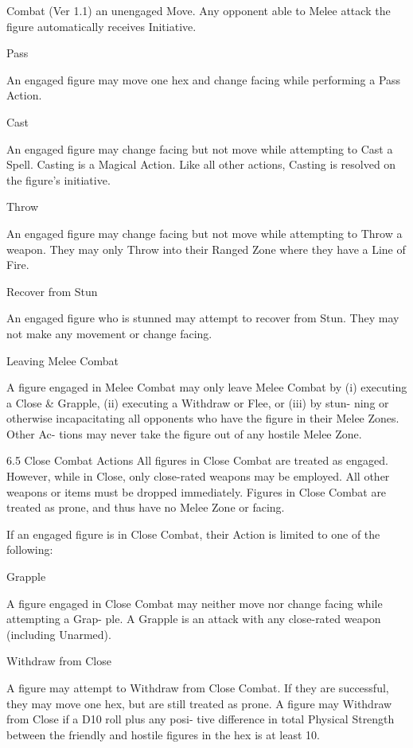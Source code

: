 \begin{Chapter}{Combat (Ver 1.1)}
an unengaged Move.  Any  opponent able  to  Melee 
attack the figure automatically receives Initiative. 

Pass 

An engaged figure may move one hex and change 
facing while performing a Pass Action. 

Cast 

An  engaged  figure  may  change  facing  but  not 
move while attempting to Cast a Spell. Casting is a 
Magical  Action.  Like  all  other  actions,  Casting  is 
resolved on the figure’s initiative. 

Throw 

An  engaged  figure  may  change  facing  but  not 
move  while  attempting  to  Throw  a  weapon.  They 
may  only  Throw  into  their  Ranged  Zone  where 
they have a Line of Fire. 

Recover from Stun 

An  engaged  figure  who  is  stunned  may  attempt  to 
recover  from  Stun.  They  may  not  make  any 
movement or change facing. 

Leaving Melee Combat 

A figure engaged in Melee Combat may only leave 
Melee Combat by (i) executing a Close \& Grapple, 
(ii) executing a Withdraw or  Flee, or (iii) by stun-
ning or otherwise incapacitating all opponents who 
have  the  figure  in  their  Melee  Zones.  Other  Ac-
tions  may  never  take  the  figure  out  of  any  hostile 
Melee Zone. 

6.5 Close Combat Actions 
All figures in Close Combat are treated as engaged. 
However, while in Close, only close-rated weapons 
may be employed. All other weapons or items must 
be dropped immediately. Figures in Close Combat 
are treated as prone, and thus have no Melee Zone 
or facing. 

If  an  engaged  figure  is  in  Close  Combat,  their 
Action is limited to one of the following: 

Grapple 

A  figure  engaged  in  Close  Combat  may  neither 
move  nor  change  facing  while  attempting  a  Grap-
ple.  A  Grapple  is  an  attack  with  any  close-rated 
weapon (including Unarmed). 

Withdraw from Close 

A  figure  may  attempt  to  Withdraw  from  Close 
Combat. If they are successful, they may move one 
hex,  but  are  still  treated  as  prone.  A  figure  may 
Withdraw  from  Close  if  a  D10  roll  plus  any  posi-
tive  difference  in  total  Physical  Strength  between 
the friendly and hostile figures in the hex is at least 
10. 


\end{Chapter}

